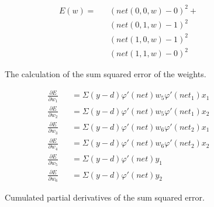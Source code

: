 \documentclass{article}
\begin{document}
\begin{figure}[H]
	\centering
	\begin{eqnarray}
		E(w) = && (net(0, 0, w) - 0)^2 + \\
				&& (net(0, 1, w) - 1)^2 \\
				&& (net(1, 0, w) - 1)^2 \\
				&& (net(1, 1, w) - 0)^2
	\end{eqnarray}
	\caption{The calculation of the sum squared error of the weights.}
	\label{fig:sse}
\end{figure}

\begin{figure}[H]
	\centering
	\begin{eqnarray}
		\frac{\partial E}{\partial w_1} &&= \Sigma{(y - d)\varphi'(net)w_5\varphi'(net_1)x_1} \\
		\frac{\partial E}{\partial w_2} &&= \Sigma{(y - d)\varphi'(net)w_5\varphi'(net_1)x_2} \\
		\frac{\partial E}{\partial w_3} &&= \Sigma{(y - d)\varphi'(net)w_6\varphi'(net_2)x_1} \\
		\frac{\partial E}{\partial w_4} &&= \Sigma{(y - d)\varphi'(net)w_6\varphi'(net_2)x_2} \\
		\frac{\partial E}{\partial w_5} &&= \Sigma{(y - d)\varphi'(net)y_1} \\
		\frac{\partial E}{\partial w_6} &&= \Sigma{(y - d)\varphi'(net)y_2}
	\end{eqnarray}
	\caption{Cumulated partial derivatives of the sum squared error.}
	\label{fig:dsse}
\end{figure}



\end{document}

